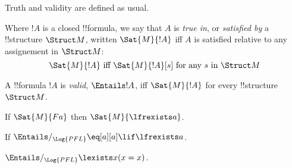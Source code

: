 \documentclass[../../../include/open-logic-section]{subfiles}
\begin{document}
Truth and validity are defined as usual.

\begin{defn}[Truth]
Where $!A$ is a closed !!{formula}, we say that $A$ is \emph{true in}, or
\emph{satisfied by} a !!{structure} $\Struct M$, written $\Sat{M}{!A}$ iff 
$A$ is satisfied relative to any assignement in $\Struct M$:
$$\Sat{M}{!A}\textrm{ iff }\Sat{M}{!A}[s]\textrm{ for any }s\textrm{ in }\Struct M$$
\end{defn}

\begin{defn}[Validity]
A !!{formula} $!A$ is \emph{valid}, $\Entails !A$, iff $\Sat{M}{!A}$ for every
!!{structure}~$\Struct M$.
\end{defn}

\begin{ex}
If $\Sat{M}{Fa}$ then $\Sat{M}{\lfrexists a}$.
\end{ex}

\begin{ex}
If $\Entails/_{\Log{PFL}} \eq[a][a]\lif\lfrexists a$.
\end{ex}

\begin{ex}
$\Entails/_{\Log{PFL}} \lexists x (x = x)$.
\end{ex}
\end{document}
